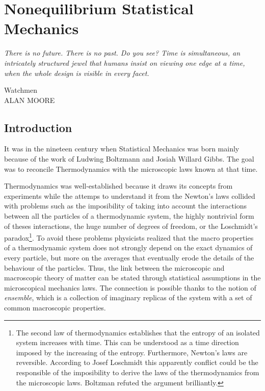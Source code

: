 \documentclass[b5paper,openright,10pt]{book}
\begin{document}
\chapter{Nonequilibrium Statistical Mechanics}
\label{Chap:NESM}
\pagestyle{chapters}  %
\epigraph{\textit{There is no future. There is no past. Do you see? Time is simultaneous, an intricately structured jewel that humans insist on viewing one edge at a time, when the whole design is visible in every facet.}}{Watchmen \\ ALAN MOORE} 

\section{Introduction}
It was in the nineteen century when Statistical Mechanics was born mainly because of the work of Ludwing Boltzmann and Josiah Willard Gibbs. The goal was to reconcile Thermodynamics with the microscopic laws known at that time. 

Thermodynamics was well-established because it draws its concepts from experiments while the attemps to understand it from the Newton's laws collided with problems such as the imposibility of taking into account the interactions between all the particles of a thermodynamic system, the highly nontrivial form of theses interactions, the huge number of degrees of freedom, or the Loschmidt's paradox\footnote{The second law of thermodynamics establishes that the entropy of an isolated system increases with time. This can be understood as a time direction imposed by the increasing of the entropy. Furthermore, Newton's laws are reversible. According to Josef Loschmidt this apparently conflict could be the responsible of the imposibility to derive the laws of the thermodynamics from the microscopic laws. Boltzman refuted the argument brilliantly.}. 
To avoid these problems physicists realized that the macro properties of a thermodynamic system does not strongly depend on the exact dynamics of every particle, but more on the averages that eventually erode the details of the behaviour of the particles. 
Thus, the link between the microscopic and macroscopic theory of matter can be stated through statistical assumptions in the microscopical mechanics laws. 
The connection is possible thanks to the notion of \textit{ensemble}, which is a collection of imaginary replicas of the system with a set of common macroscopic properties.  
\end{document}

